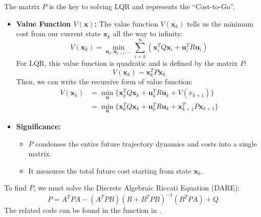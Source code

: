 \documentclass[11pt]{article}
\begin{document}
The matrix $P$ is the key to solving LQR and represents the ``Cost-to-Go''.

\begin{itemize}
    \item \textbf{Value Function $V(\mathbf{x})$:}
          The value function $V(\mathbf{x}_k)$ tells us the minimum cost from our current state $\mathbf{x}_k$ all the way to infinity:
          \begin{equation}
              V(\mathbf{x}_k) = \min_{\mathbf{u}_k, \mathbf{u}_{k+1}, \dots} \sum_{i=k}^{\infty} \left( \mathbf{x}_i^T Q \mathbf{x}_i + \mathbf{u}_i^T R \mathbf{u}_i \right)
          \end{equation}
          For LQR, this value function is quadratic and is defined by the matrix $P$:
          \begin{equation}
              V(\mathbf{x}_k) = \mathbf{x}_k^T P \mathbf{x}_k
          \end{equation}
          Then, we can write the recursive form of value function:
          \begin{equation}
              \begin{split}
                  V(\mathbf{x}_k) &= \min_{\mathbf{u}} \{ \mathbf{x}_k^T Q \mathbf{x}_k + \mathbf{u}_k^T R \mathbf{u}_k +V(x_{k+1})\} \\
                  &= \min_{\mathbf{u}} \{ \mathbf{x}_k^T Q \mathbf{x}_k + \mathbf{u}_k^T R \mathbf{u}_k +\mathbf{x}^T_{k+1}P\mathbf{x}_{k+1}\}
              \end{split}
          \end{equation}
    \item \textbf{Significance:}
          \begin{itemize}
              \item $P$ condenses the entire future trajectory dynamics and costs into a single matrix.
              \item It measures the total future cost starting from state $\mathbf{x}_k$.
          \end{itemize}
\end{itemize}

To find $P$, we must solve the Discrete Algebraic Riccati Equation (DARE):
\begin{equation}
    P = A^T P A - (A^T P B)(R + B^T P B)^{-1} (B^T P A) + Q
\end{equation}
The related code can be found in the function \textcolor{teal}{\texttt{}} in \textcolor{teal}{\texttt{\allowbreak{}}}.
\end{document}
